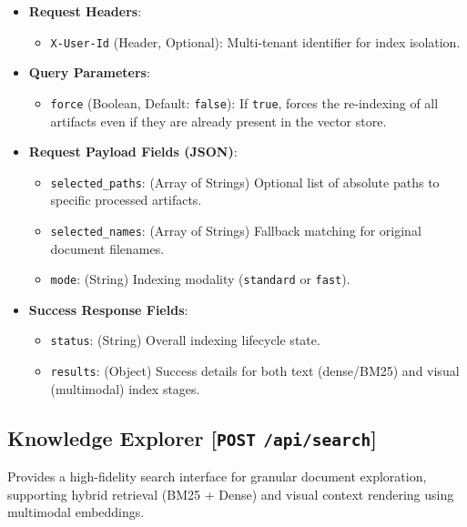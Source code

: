 \begin{itemize}
    \item \textbf{Request Headers}:
    \begin{itemize}
        \item \texttt{X-User-Id} (Header, Optional): Multi-tenant identifier for index isolation.
    \end{itemize}
    \item \textbf{Query Parameters}:
    \begin{itemize}
        \item \texttt{force} (Boolean, Default: \texttt{false}): If \texttt{true}, forces the re-indexing of all artifacts even if they are already present in the vector store.
    \end{itemize}
    \item \textbf{Request Payload Fields (JSON)}:
    \begin{itemize}
        \item \texttt{selected\_paths}: (Array of Strings) Optional list of absolute paths to specific processed artifacts.
        \item \texttt{selected\_names}: (Array of Strings) Fallback matching for original document filenames. 
        \item \texttt{mode}: (String) Indexing modality (\texttt{standard} or \texttt{fast}).
    \end{itemize}
    \item \textbf{Success Response Fields}:
    \begin{itemize}
        \item \texttt{status}: (String) Overall indexing lifecycle state.
        \item \texttt{results}: (Object) Success details for both text (dense/BM25) and visual (multimodal) index stages.
    \end{itemize}
\end{itemize}

\subsection{Knowledge Explorer [\texttt{POST} \texttt{/api/search}]}
Provides a high-fidelity search interface for granular document exploration, supporting hybrid retrieval (BM25 + Dense) and visual context rendering using multimodal embeddings.


